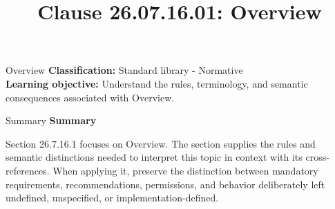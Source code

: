 \documentclass[10pt,letterpaper]{article}
\title{Clause 26.07.16.01: Overview}
\author{}
\date{}
\begin{document}
\maketitle
\begin{CornellOverviewBox}{Overview}
\textbf{Classification:} Standard library - Normative\\[2pt]
\textbf{Learning objective:} Understand the rules, terminology, and semantic consequences associated with Overview.
\end{CornellOverviewBox}\begin{CornellSummaryBox}{Summary}
{\sffamily\bfseries\color{Accent} Summary}\par\vspace{3pt}Section 26.7.16.1 focuses on Overview. The section supplies the rules and semantic distinctions needed to interpret this topic in context with its cross-references. When applying it, preserve the distinction between mandatory requirements, recommendations, permissions, and behavior deliberately left undefined, unspecified, or implementation-defined.
\end{CornellSummaryBox}
\end{document}
